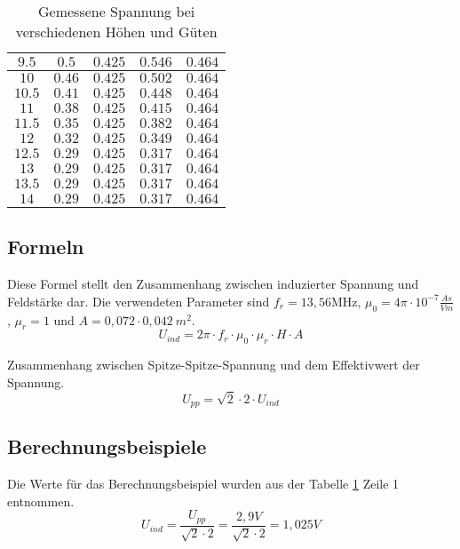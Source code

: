 \documentclass[12pt,a4paper,ngerman]{article}
\begin{document}
\begin{table}[H]
\begin{center}
\begin{tabular}{ |c|c|c|c|c| }
  $9.5$ & $0.5$ & $0.425$ & $0.546$ & $0.464$ \\
      \hline
  $10$ & $0.46$ & $0.425$ & $0.502$ & $0.464$ \\
      \hline
  $10.5$ & $0.41$ & $0.425$ & $0.448$ & $0.464$ \\
      \hline
  $11$ & $0.38$ & $0.425$ & $0.415$ & $0.464$ \\
      \hline
  $11.5$ & $0.35$ & $0.425$ & $0.382$ & $0.464$ \\
      \hline
  $12$ & $0.32$ & $0.425$ & $0.349$ & $0.464$ \\
      \hline
  $12.5$ & $0.29$ & $0.425$ & $0.317$ & $0.464$ \\
      \hline
  $13$ & $0.29$ & $0.425$ & $0.317$ & $0.464$ \\
      \hline
  $13.5$ & $0.29$ & $0.425$ & $0.317$ & $0.464$ \\
        \hline
  $14$ & $0.29$ & $0.425$ & $0.317$ & $0.464$ \\  \hline
\end{tabular}
\caption{Gemessene Spannung bei verschiedenen Höhen und Güten}
\end{center}
\label{tab:1}
\end{table}
\pagebreak
\subsection{Formeln}
Diese Formel stellt den Zusammenhang zwischen induzierter Spannung und Feldstärke dar. Die verwendeten Parameter sind $f_r = 13,56$MHz, $\mu_0 = 4\pi \cdot 10^{-7}\frac{As}{Vm}$, $\mu_r = 1$ und $A = 0,072 \cdot 0,042\ m^2$.
\begin{equation}
U_{ind} = 2\pi \cdot f_r \cdot \mu_0 \cdot \mu_r \cdot H \cdot A
\end{equation}

Zusammenhang zwischen Spitze-Spitze-Spannung und dem Effektivwert der Spannung.
\begin{equation}
U_{pp} = \sqrt{2}  \cdot 2 \cdot U_{ind}
\end{equation}

\subsection{Berechnungsbeispiele}
Die Werte für das Berechnungsbeispiel wurden aus der Tabelle \ref{tab:1} Zeile 1 entnommen.
\begin{equation}
U_{ind} = \frac{U_{pp}}{\sqrt{2}  \cdot 2} = \frac{2,9V}{\sqrt{2}  \cdot 2} = 1,025V
\end{equation}
\end{document}

